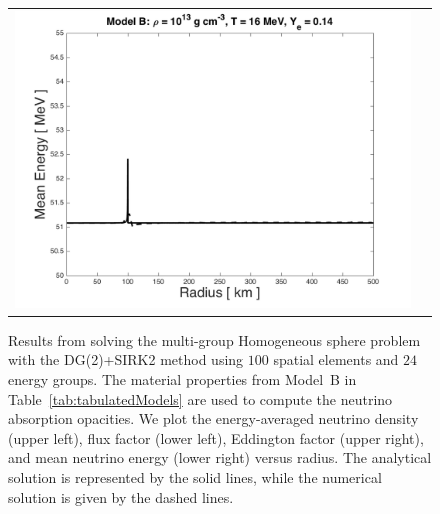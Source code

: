 \documentclass[11pt,letterpaper,twoside,english,final]{article}
\begin{document}
\begin{figure}[h]
\begin{tabular}{cc}
    \includegraphics[scale=0.4]{./Figures/HomogeneousSphereTable_B_MeanEnergy}
  \end{tabular}
  \vspace{-0.1in}
  \flushleft\caption[Results from solving the multi-group Homogeneous sphere problem with the DG(2)+SIRK2 method using $100$ spatial elements and $24$ energy groups.]{Results from solving the multi-group Homogeneous sphere problem with the DG(2)+SIRK2 method using $100$ spatial elements and $24$ energy groups.  \textmd{The material properties from Model~B in Table~\ref{tab:tabulatedModels} are used to compute the neutrino absorption opacities.  We plot the energy-averaged neutrino density (upper left), flux factor (lower left), Eddington factor (upper right), and mean neutrino energy (lower right) versus radius.  The analytical solution is represented by the solid lines, while the numerical solution is given by the dashed lines.}}
  \label{fig:homogeneousSphere1D_weaklib_B}
\end{figure}
\end{document}
